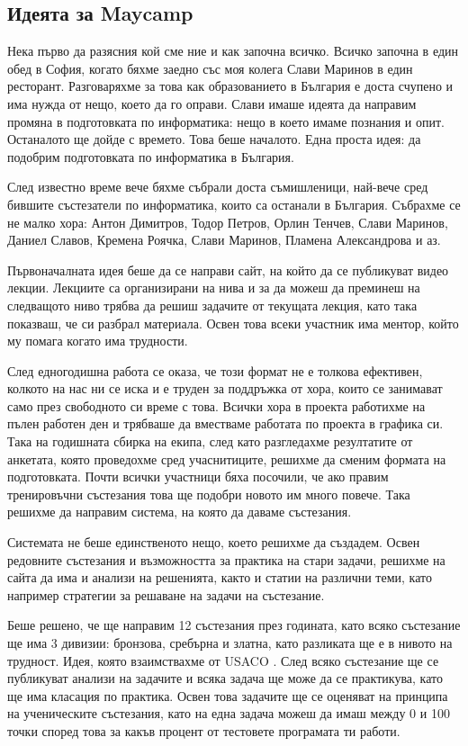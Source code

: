 \documentclass[a4paper,12pt]{article}
\begin{document}
  \subsection{Идеята за Maycamp}
  
  Нека първо да разясния кой сме ние и как започна всичко. Всичко започна в един обед в София, когато бяхме заедно със моя колега Слави Маринов в един ресторант. Разговаряхме за това как образованието в България е доста счупено и има нужда от нещо, което да го оправи. Слави имаше идеята да направим промяна в подготовката по информатика: нещо в което имаме познания и опит. Останалото ще дойде с времето. Това беше началото. Една проста идея: да подобрим подготовката по информатика в България.
  
  След известно време вече бяхме събрали доста съмишленици, най-вече сред бившите състезатели по информатика, които са останали в България. Събрахме се не малко хора: Антон Димитров, Тодор Петров, Орлин Тенчев, Слави Маринов, Даниел Славов, Кремена Роячка, Слави Маринов, Пламена Александрова и аз.
  
  Първоначалната идея беше да се направи сайт, на който да се публикуват видео лекции. Лекциите са организирани на нива и за да можеш да преминеш на следващото ниво трябва да решиш задачите от текущата лекция, като така показваш, че си разбрал материала. Освен това всеки участник има ментор, който му помага когато има трудности.
  
  След едногодишна работа се оказа, че този формат не е толкова ефективен, колкото на нас ни се иска и е труден за поддръжка от хора, които се занимават само през свободното си време с това. Всички хора в проекта работихме на пълен работен ден и трябваше да вместваме работата по проекта в графика си. Така на годишната сбирка на екипа, след като разгледахме резултатите от анкетата, която проведохме сред учаснитиците, решихме да сменим формата на подготовката. Почти всички участници бяха посочили, че ако правим тренировъчни състезания това ще подобри новото им много повече. Така решихме да направим система, на която да даваме състезания.
  
  Системата не беше единственото нещо, което решихме да създадем. Освен редовните състезания и възможността за практика на стари задачи, решихме на сайта да има и анализи на решенията, както и статии на различни теми, като например стратегии за решаване на задачи на състезание.
  
  Беше решено, че ще направим 12 състезания през годината, като всяко състезание ще има 3 дивизии: бронзова, сребърна и златна, като разликата ще е в нивото на трудност. Идея, която взаимствахме от USACO \cite{usaco_website}. След всяко състезание ще се публикуват анализи на задачите и всяка задача ще може да се практикува, като ще има класация по практика. Освен това задачите ще се оценяват на принципа на ученическите състезания, като на една задача можеш да имаш между 0 и 100 точки според това за какъв процент от тестовете програмата ти работи.
  
\end{document}
